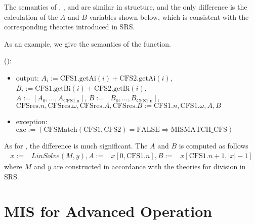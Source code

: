 \documentclass[12pt, titlepage]{article}
\begin{document}
The semantics of , , and  are similar in structure, and the only difference is the calculation of the $A$ and $B$ variables shown below, which is consistent with the corresponding theories introduced in SRS.

As an example, we give the semantics of the  function.

\noindent {}():
\begin{itemize}
	\item output: $A_i:=\text{CFS1}.\text{getAi}(i)+\text{CFS2}.\text{getAi}(i)$,
	$B_i:=\text{CFS1}.\text{getBi}(i)+\text{CFS2}.\text{getBi}(i)$,\\
	$A:=[A_0, ..., A_{\text{CFS1.n}}]$, $B:=[B_0, ..., B_{\text{CFS1.n}}]$,\\
	$\text{CFSres}.n, \text{CFSres}.\omega, \text{CFSres}.A, \text{CFSres}.B:=\text{CFS1}.n, \text{CFS1}.\omega, A, B$
	\item exception: $\text{exc}:=(\text{CFSMatch}(\text{CFS1}, \text{CFS2})=\text{FALSE}\Rightarrow\text{MISMATCH\_CFS})$
\end{itemize}

As for , the difference is much significant. The $A$ and $B$ is computed as follows
\begin{align*}
	x:=&LinSolve(M, y),
	A:=&x[0,\text{CFS1}.n],
	B:=&x[\text{CFS1}.n+1, |x|-1]
\end{align*}
where $M$ and $y$ are constructed in accordance with the theories for division in SRS.

\section{MIS for Advanced Operation}
\end{document}
